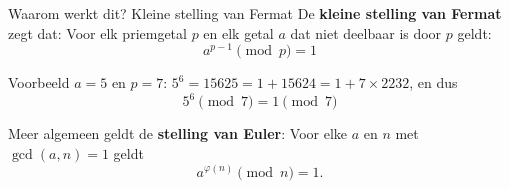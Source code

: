 \documentclass{beamer}
\begin{document}

%

\begin{frame}{Waarom werkt dit? Kleine stelling van Fermat}
De \textbf{kleine stelling van Fermat} zegt dat:
	Voor elk priemgetal $p$ en elk getal $a$ dat niet deelbaar is door $p$ geldt:  
	\[ a^{p-1} \pmod{p} = 1 \]
	
	Voorbeeld $a = 5$ en $p = 7$:  $5^6 = 15625 = 1 + 15624 = 1 + 7 \times 2232$, en dus
	\[
	5^6 \pmod{7} = 1 \pmod{7}
	\]
	
Meer algemeen geldt de \textbf{stelling van Euler}: 
Voor elke $a$ en $n$ met $\gcd(a,n) = 1$ geldt
\[
a^{\varphi(n)} \pmod{n} = 1.
\]
	
\end{frame}
\end{document}

